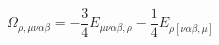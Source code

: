 \begin{equation}
\Omega_{\rho,\mu\nu\alpha\beta} = - \frac{3}{4}
E_{\mu\nu\alpha\beta,\rho} - \frac{1}{4} E_{\rho[\nu\alpha\beta,\mu]}
\end{equation}

